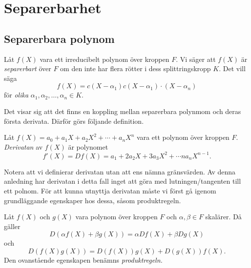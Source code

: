 \documentclass{article}
\theoremstyle{definition}
\begin{document}
\section{Separerbarhet}
\subsection{Separerbara polynom}
\begin{mydef}{}{}
  Låt $f(X)$ vara ett irreducibelt polynom över kroppen $F$. Vi säger att $f(X)$ är \textit{separerbart} över $F$ om den inte har flera 
  rötter i dess splittringskropp $K$. Det vill säga 
  \[f(X) = c(X-\alpha_1)c(X-\alpha_1)\cdot (X-\alpha_n)\]
  för \textit{olika} $\alpha_1, \alpha_2, \ldots, \alpha_n \in K.$
\end{mydef}
Det visar sig att det finns en koppling mellan separerbara polynmom och deras första derivata. Därför görs följande definition. 
\begin{mydef}{}{}
  Låt $f(X) = a_0 + a_1X + a_2X^2 + \cdots + a_nX^n$ vara ett polynom över kroppen $F$. \textit{Derivatan} av $f(X)$ är polynomet 
  \[f'(X) = Df(X) = a_1 + 2a_2X + 3a_3X^2 + \cdots na_nX^{n-1}.\]
\end{mydef}
Notera att vi definierar derivatan utan att ens nämna gränsvärden. Av denna anledning har derivatan i detta fall inget att göra med lutningen/tangenten 
till ett polnom. För att kunna utnyttja derivatan måste vi först gå igenom grundläggande egenskaper hos dessa, såsom produktregeln. 

\begin{mylemma}{}{}
  Låt $f(X)$ och $g(X)$ vara polynom över kroppen $F$ och $\alpha, \beta \in F$ skalärer. Då gäller 
  \[ D(\alpha f(X) + \beta g(X))  = \alpha Df(X) + \beta D g(X) \]
  och
  \[ D(f(X)g(X)) = D(f(X))g(X) + D(g(X)) f(X).\]
  Den ovanstående egenskapen benämns \textit{produktregeln.}
\end{mylemma}
\end{document}
